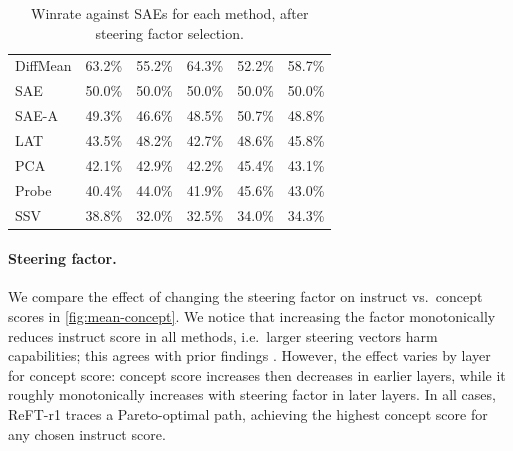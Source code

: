 \documentclass{article}
\theoremstyle{plain}
\theoremstyle{definition}
\theoremstyle{remark}
\renewcommand{\cite}{\citep}
\newcommand{\methodtag}[2]{%
  \tikz[baseline=(char.base)]{%
    \node[
      fill=#1,
      rounded corners=2pt,
      text=white,
      font=\bfseries,
      minimum width=1em,
      minimum height=1em,
      align=center,
      inner sep=0pt
    ](char){#2};%
  }%
}
\newcommand{\steeringtag}{\protect\methodtag{steeringcolor}{S}}
\begin{document}
\begin{table}[]
{\begin{tabular}{lccccc}
DiffMean & 63.2\% & 55.2\% & 64.3\% & 52.2\% & 58.7\% \\
SAE & 50.0\% & 50.0\% & 50.0\% & 50.0\% & 50.0\% \\
SAE-A & 49.3\% & 46.6\% & 48.5\% & 50.7\% & 48.8\% \\
LAT & 43.5\% & 48.2\% & 42.7\% & 48.6\% & 45.8\% \\
PCA & 42.1\% & 42.9\% & 42.2\% & 45.4\% & 43.1\% \\
Probe & 40.4\% & 44.0\% & 41.9\% & 45.6\% & 43.0\% \\
SSV & 38.8\% & 32.0\% & 32.5\% & 34.0\% & 34.3\% \\
\bottomrule
\end{tabular}
}
    \caption{\steeringtag{} Winrate against SAEs for each method, after steering factor selection.}
    \label{tab:winrate}
\end{table}


\paragraph{Steering factor.} We compare the effect of changing the steering factor on instruct vs.~concept scores in \cref{fig:mean-concept}. We notice that increasing the factor monotonically reduces instruct score in all methods, i.e.~larger steering vectors harm capabilities; this agrees with prior findings \cite{durmus2024steering,chalnev2024improvingsteeringvectorstargeting}. However, the effect varies by layer for concept score: concept score increases then decreases in earlier layers, while it roughly monotonically increases with steering factor in later layers. In all cases, ReFT-r1 traces a Pareto-optimal path, achieving the highest concept score for any chosen instruct score.

\end{document}

